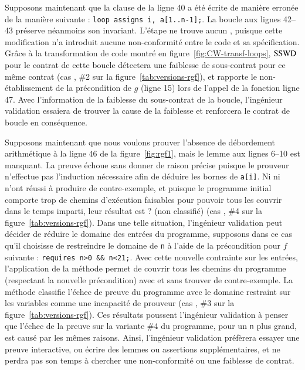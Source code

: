 Supposons maintenant que la clause de la ligne 40 a été écrite de manière
erronée de la manière suivante : \lstinline'loop assigns i, a[1..n-1];'.
La boucle aux lignes 42--43 préserve néanmoins son invariant.
L'étape \NCD ne trouve aucun \NCCE, puisque cette modification n'a introduit
aucune non-conformité entre le code et sa spécification.
Grâce à la transformation de code montré en figure~\ref{fig:CW-transf-loops},
$\mathrm{SSWD}$ pour le contrat de cette boucle détectera une faiblesse de sous-contrat
pour ce même contrat (cas , \#2 sur la
figure~\ref{tab:versions-rgf}), et rapporte le non-établissement de la
précondition de $g$ (ligne 15) lors de l'appel de la fonction ligne 47.
Avec l'information de la faiblesse du sous-contrat de la boucle, l'ingénieur
validation essaiera de trouver la cause de la faiblesse et renforcera le contrat
de boucle en conséquence.

Supposons maintenant que nous voulons prouver l'absence de débordement
arithmétique à la ligne 46 de la figure~\ref{fig:rgf1}, mais le lemme aux lignes
6--10 est manquant.
La preuve échoue sans donner de raison précise puisque le prouveur n'effectue
pas l'induction nécessaire afin de déduire les bornes de \lstinline'a[i]'.
Ni \NCD ni \SWD n'ont réussi à produire de contre-exemple, et puisque le
programme initial comporte trop de chemins d'exécution faisables pour pouvoir
tous les couvrir dans le temps imparti, leur résultat est \textsf{?}
(non classifié) (cas , \#4 sur la figure~\ref{tab:versions-rgf}).
Dans une telle situation, l'ingénieur validation peut décider de réduire le
domaine des entrées du programme, supposons dans ce cas qu'il choisisse de
restreindre le domaine de \lstinline'n' à l'aide de la précondition pour $f$
suivante : \lstinline'requires n>0 && n<21;'.
Avec cette nouvelle contrainte sur les entrées, l'application de la méthode
permet de couvrir tous les chemins du programme (respectant la nouvelle
précondition) avec \NCD et \SWD sans trouver de contre-exemple.
La méthode classifie l'échec de preuve du programme avec le domaine restraint
sur les variables comme une incapacité de prouveur (cas ,
\#3 sur la figure~\ref{tab:versions-rgf}).
Ces résultats poussent l'ingénieur validation à penser que l'échec de la preuve
sur la variante \#4 du programme, pour un \lstinline'n' plus grand, est causé
par les mêmes raisons.
Ainsi, l'ingénieur validation préfèrera essayer une preuve interactive, ou
écrire des lemmes ou assertions supplémentaires, et ne perdra pas son temps à
chercher une non-conformité ou une faiblesse de contrat.


